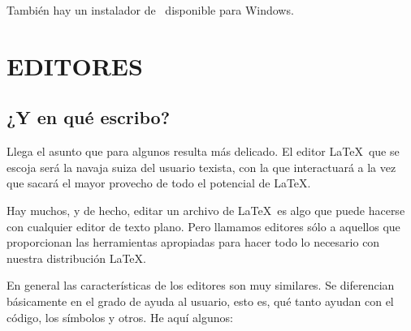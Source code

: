 		También hay un instalador de \TeXLive\ disponible para Windows.
		
	\section{EDITORES}
		
		\subsection{¿Y en qué escribo?}
		
		Llega el asunto que para algunos resulta más delicado. El editor \LaTeX\ que se escoja será la navaja suiza del usuario texista, con la que interactuará a la vez que sacará el mayor provecho de todo el potencial de \LaTeX.
		
		Hay muchos, y de hecho, editar un archivo de \LaTeX\ es algo que puede hacerse con cualquier editor de texto plano. Pero llamamos editores sólo a aquellos que proporcionan las herramientas apropiadas para hacer todo lo necesario con nuestra distribución \LaTeX.
		
		En general las características de los editores son muy similares. Se diferencian básicamente en el grado de ayuda al usuario, esto es, qué tanto ayudan con el código, los símbolos y otros. He aquí algunos:
		
